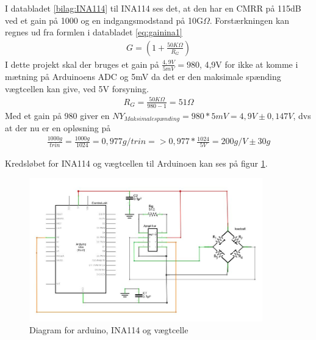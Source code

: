 I databladet \ref{bilag:INA114} til INA114 ses det, at den har en CMRR på 115dB ved et gain på 1000 og en indgangsmodstand på 10G$\Omega$. Forstærkningen kan regnes ud fra formlen i databladet \ref{eq:gainina1}
\begin{align}
 G=(1+\frac{50K\Omega}{R_{G}})
 \label{eq:gainina1}
 \end{align} 
 I dette projekt skal der bruges et gain på $\frac{4,9V}{5mV}=980$, 4,9V for ikke at komme i mætning på Arduinoens ADC og 5mV da det er den maksimale spænding vægtcellen kan give, ved 5V forsyning.
 \begin{align}
 R_{G}=\frac{50K\Omega}{980-1}=51\Omega
 \label{eq:gainina2}
 \end{align}
Med et gain på 980 giver en $NY_{Maksimalespænding}=980*5mV=4,9V \pm0,147V$, dvs at der nu er en opløsning på
\begin{align}
 \frac{1000g}{trin}=\frac{1000g}{1024}=0,977g/trin=>0,977*\frac{1024}{5V}=200g/V \pm30g
 \label{eq:gainina3}
 \end{align}
 
 Kredsløbet for INA114 og vægtcellen til Arduinoen kan ses på figur \ref{fig:loadcelldiagram}.
 
  \begin{figure}[H]
	\centering
	\includegraphics[width=0.9\textwidth]{billeder/Hardware/diagrammer/loadcelldiagram.JPG}
	\caption{Diagram for arduino, INA114 og vægtcelle}
	\label{fig:loadcelldiagram}
\end{figure}


